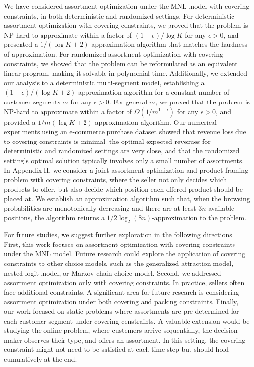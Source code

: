 \documentclass[msom,non-blindrev]{informs3} %
\theoremstyle{definition}
\begin{document}
We have considered assortment optimization under the MNL model with covering constraints, in both deterministic and randomized settings. For deterministic assortment optimization with covering constraints, we proved that the problem is NP-hard to approximate within a factor of $(1+\epsilon)/\log K$ for any $\epsilon>0$, and presented a $1/(\log K + 2)$-approximation algorithm that matches the hardness of approximation. For randomized assortment optimization with covering constraints, we showed that the problem can be reformulated as an equivalent linear program, making it solvable in polynomial time. Additionally, we extended our analysis to a deterministic multi-segment model, establishing a $(1-\epsilon)/(\log K + 2)$-approximation algorithm for a constant number of customer segments $m$ for any $\epsilon>0$. For general $m$, we proved that the problem is NP-hard to approximate within a factor of $\Omega(1/m^{1-\epsilon})$ for any $\epsilon > 0$, and provided a $1/m(\log K + 2)$-approximation algorithm. Our numerical experiments using an e-commerce purchase dataset showed that revenue loss due to covering constraints is minimal, the optimal expected revenues for deterministic and randomized settings are very close, and that the randomized setting’s optimal solution typically involves only a small number of assortments. {  In Appendix H, we consider a joint assortment optimization and product framing problem with covering constraints, where the seller not only decides which products to offer, but also decide which position each offered product should be placed at. We establish an approximation algorithm such that, when the browsing probabilities are monotonically decreasing and there are at least $3n$ available positions, the algorithm returns a $1/2\log_2(8n)$-approximation to the problem.}


For future studies, we suggest further exploration in the following directions. First, this work focuses on assortment optimization with covering constraints under the MNL model. Future research could explore the application of covering constraints to other choice models, such as the generalized attraction model, nested logit model, or Markov chain choice model.
Second, we addressed assortment optimization only with covering constraints. In practice, sellers often face additional constraints. A significant area for future research is considering assortment optimization under both covering and packing constraints. Finally, our work focused on static problems where assortments are pre-determined for each customer segment under covering constraints. A valuable extension would be studying the online problem, where customers arrive sequentially, the decision maker observes their type, and offers an assortment. In this setting, the covering constraint might not need to be satisfied at each time step but should hold cumulatively at the end.
\end{document}
